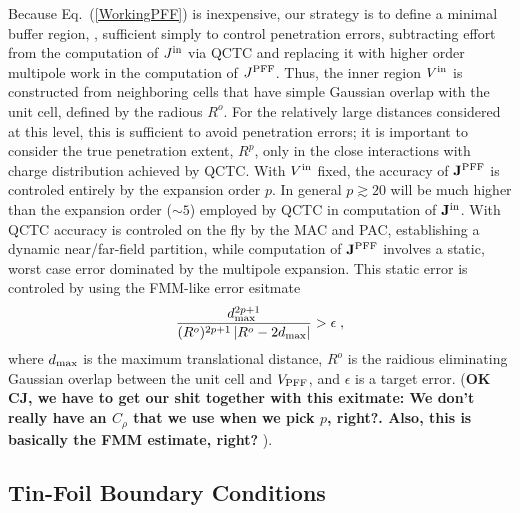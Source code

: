 \commentoutA{\documentclass[prb,aps,twocolumn,showpacs,twocolumngrid,superbib]{revtex4}}
\begin{document}
\newpage
\newpage

Because Eq.~(\ref{WorkingPFF}) is inexpensive, our strategy is to define a minimal buffer region,  , sufficient 
simply to control penetration errors, subtracting effort from the computation of $J^{\rm in}$ via QCTC and replacing
it with higher order multipole work in the computation of $J^{\rm PFF}$.  Thus, the inner region $V^{\rm in}$ is constructed 
from neighboring cells that have simple Gaussian overlap with the unit cell, defined by the radious $R^{o}$.  
For the relatively large distances considered at this level, this is sufficient to avoid penetration errors;  it is 
important to consider the true penetration extent, $R^p$, only in the close interactions with charge distribution achieved by QCTC.  
With $V^{\rm in}$ fixed, the accuracy of ${\bf J}^{\rm PFF}$ is controled entirely by the expansion order $p$.  
In general $p \gtrsim 20$ will be much higher than the expansion order ($\sim 5$) employed by QCTC in computation of ${\bf J}^{\rm in}$.  
With QCTC accuracy is controled on the fly by the MAC and PAC, establishing a dynamic near/far-field partition, while 
computation of ${\bf J}^{\rm PFF}$ involves a static, worst case error dominated by the multipole expansion.  
This static error is controled by using the FMM-like error esitmate 
\begin{equation}
\frac{ {d}_{\rm max}^{2 p+1}}
{({R}^o)^{2 p+1}\left| {R}^o -2 {d}_{\rm max} \right| } 
> \epsilon \;,
\end{equation}
where $d_{\rm max}$ is the maximum translational distance, $R^o$ is the raidious eliminating Gaussian overlap 
between the unit cell and $V_{\rm PFF}$, and $\epsilon$ is a target error.
({\bf OK CJ, we have to get our shit together with this exitmate:  We don't really have an $C_\rho$ that
we use when we pick $p$, right?.  Also, this is basically the FMM estimate, right? }).


\newpage
\newpage

\subsection{Tin-Foil Boundary Conditions}
\end{document}
